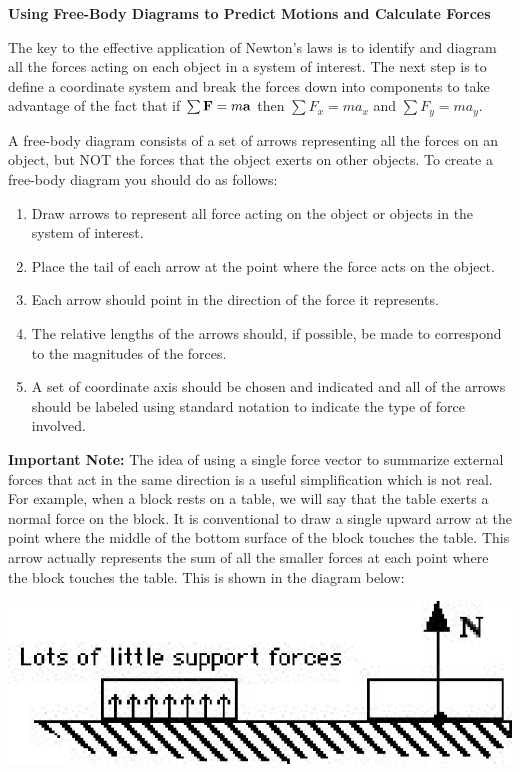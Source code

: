 \textbf{Using Free-Body Diagrams to Predict Motions and Calculate Forces }

The key to the effective application of Newton's laws is to identify and diagram
all the forces acting on each object in a system of interest. The next step
is to define a coordinate system and break the forces down into components to
take advantage of the fact that if \( \sum{\bf F}  = m{\bf a}\) then
\( \sum F_{x} = ma_{x} \) and \( \sum F_{y} =
ma_{y} \).

A free-body diagram consists of a set of arrows representing all the forces
on an object, but NOT the forces that the object exerts on other objects. To
create a free-body diagram you should do as follows: 

\begin{enumerate}
\item Draw arrows to represent all force acting on the object or objects in the system
of interest. 
\item Place the tail of each arrow at the point where the force acts on the object. 
\item Each arrow should point in the direction of the force it represents. 
\item The relative lengths of the arrows should, if possible, be made to correspond
to the magnitudes of the forces. 
\item A set of coordinate axis should be chosen and indicated and all of the arrows
should be labeled using standard notation to indicate the type of force involved.
\end{enumerate}
\textbf{Important Note:} The idea of using a single force vector to summarize
external forces that act in the same direction is a useful simplification which
is not real. For example, when a block rests on a table, we will say that the
table exerts a normal force on the block. It is conventional to draw a single
upward arrow at the point where the middle of the bottom surface of the block
touches the table. This arrow actually represents the sum of all the smaller
forces at each point where the block touches the table. This is shown in the
diagram below:

\vspace{0.3cm}
{\par\centering \includegraphics{friction/friction_fig1.eps} \par}
\vspace{0.3cm}

